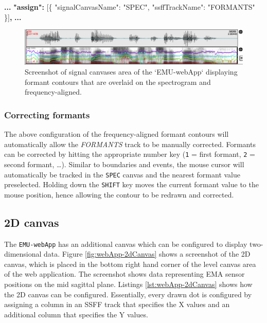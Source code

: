 \documentclass[]{book}
\newenvironment{Shaded}{\begin{snugshade}}{\end{snugshade}}
\newcommand{\DataTypeTok}[1]{\textcolor[rgb]{0.13,0.29,0.53}{#1}}
\newcommand{\ErrorTok}[1]{\textcolor[rgb]{0.64,0.00,0.00}{\textbf{#1}}}
\newcommand{\FunctionTok}[1]{\textcolor[rgb]{0.00,0.00,0.00}{#1}}
\newcommand{\OtherTok}[1]{\textcolor[rgb]{0.56,0.35,0.01}{#1}}
\newcommand{\StringTok}[1]{\textcolor[rgb]{0.31,0.60,0.02}{#1}}
\theoremstyle{definition}
\theoremstyle{definition}
\theoremstyle{definition}
\theoremstyle{remark}
\begin{document}
\begin{Shaded}
\begin{Highlighting}[]
\ErrorTok{...}
\ErrorTok{"assign":} \OtherTok{[}\FunctionTok{\{}
    \DataTypeTok{"signalCanvasName"}\FunctionTok{:} \StringTok{"SPEC"}\FunctionTok{,}
    \DataTypeTok{"ssffTrackName"}\FunctionTok{:} \StringTok{"FORMANTS"}
\FunctionTok{\}}\OtherTok{]}\ErrorTok{,}
\ErrorTok{...}
\end{Highlighting}
\end{Shaded}

\begin{figure}

{\centering \includegraphics[width=1\linewidth]{pics/emu-webAppOverlayFreqAlg} 

}

\caption{Screenshot of signal canvases area of the `EMU-webApp` displaying formant contours that are overlaid on the spectrogram and frequency-aligned.}\label{fig:webApp-overlay2}
\end{figure}

\hypertarget{correcting-formants}{%
\subsubsection{Correcting formants}\label{correcting-formants}}

The above configuration of the frequency-aligned formant contours will
automatically allow the \emph{FORMANTS} track to be manually corrected.
Formants can be corrected by hitting the appropriate number key
(\texttt{1} = first formant, \texttt{2} = second formant, \ldots{}).
Similar to boundaries and events, the mouse cursor will automatically be
tracked in the \texttt{SPEC} canvas and the nearest formant value
preselected. Holding down the \texttt{SHIFT} key moves the current
formant value to the mouse position, hence allowing the contour to be
redrawn and corrected.

\hypertarget{d-canvas}{%
\subsection{2D canvas}\label{d-canvas}}

The \texttt{EMU-webApp} has an additional canvas which can be configured
to display two-dimensional data. Figure \ref{fig:webApp-2dCanvas} shows
a screenshot of the 2D canvas, which is placed in the bottom right hand
corner of the level canvas area of the web application. The screenshot
shows data representing EMA sensor positions on the mid sagittal plane.
Listings \ref{lst:webApp-2dCanvas} shows how the 2D canvas can be
configured. Essentially, every drawn dot is configured by assigning a
column in an SSFF track that specifies the X values and an additional
column that specifies the Y values.
\end{document}
